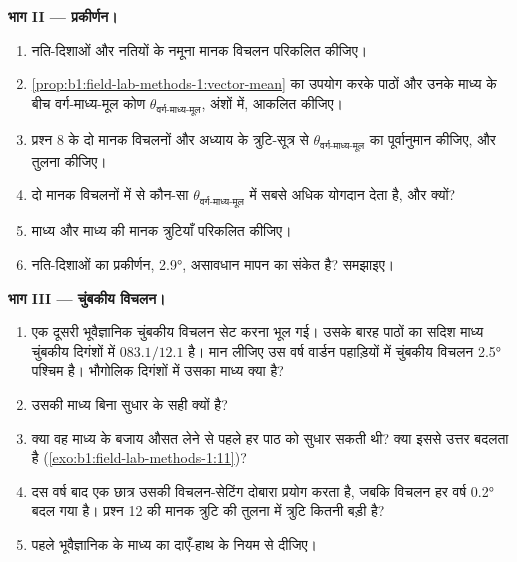 \begin{problem}
\medskip
\noindent\textbf{भाग II --- प्रकीर्णन।}
\begin{enumerate}[resume]
  \item नति-दिशाओं और नतियों के नमूना मानक विचलन परिकलित कीजिए।
  \item \cref{prop:b1:field-lab-methods-1:vector-mean} का उपयोग करके पाठों और उनके माध्य के बीच वर्ग-माध्य-मूल कोण
        $\theta_{\text{वर्ग-माध्य-मूल}}$, अंशों में, आकलित कीजिए।
  \item प्रश्न 8 के दो मानक विचलनों और अध्याय के त्रुटि-सूत्र से $\theta_{\text{वर्ग-माध्य-मूल}}$ का पूर्वानुमान कीजिए, और तुलना कीजिए।
  \item दो मानक विचलनों में से कौन-सा $\theta_{\text{वर्ग-माध्य-मूल}}$ में सबसे अधिक योगदान देता है, और क्यों?
  \item माध्य  और माध्य  की मानक त्रुटियाँ परिकलित कीजिए।
  \item नति-दिशाओं का प्रकीर्णन, \ang{2.9}, असावधान मापन का संकेत है? समझाइए।
\end{enumerate}

\medskip
\noindent\textbf{भाग III --- चुंबकीय विचलन।}
\begin{enumerate}[resume]
  \item एक दूसरी भूवैज्ञानिक चुंबकीय विचलन सेट करना भूल गई। उसके बारह पाठों का सदिश माध्य चुंबकीय दिगंशों में $083.1/12.1$
        है। मान लीजिए उस वर्ष वार्डन पहाड़ियों में चुंबकीय विचलन \ang{2.5} पश्चिम है। भौगोलिक दिगंशों में उसका माध्य क्या है?
  \item उसकी माध्य  बिना सुधार के सही क्यों है?
  \item क्या वह माध्य के बजाय औसत लेने से पहले हर पाठ को सुधार सकती थी? क्या इससे उत्तर बदलता है (\cref{exo:b1:field-lab-methods-1:11})?
  \item दस वर्ष बाद एक छात्र उसकी विचलन-सेटिंग दोबारा प्रयोग करता है, जबकि विचलन हर वर्ष \ang{0.2} बदल गया है। प्रश्न 12 की
        मानक त्रुटि की तुलना में त्रुटि कितनी बड़ी है?
  \item पहले भूवैज्ञानिक के माध्य  का  दाएँ-हाथ के नियम से दीजिए।
\end{enumerate}


\end{problem}
